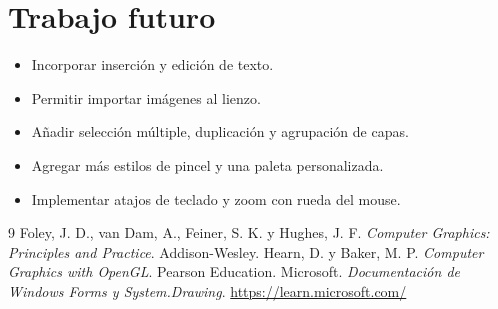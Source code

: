 \documentclass[11pt,a4paper]{report}
\begin{document}
\chapter{Trabajo futuro}

\begin{itemize}
    \item Incorporar inserción y edición de texto.
    \item Permitir importar imágenes al lienzo.
    \item Añadir selección múltiple, duplicación y agrupación de capas.
    \item Agregar más estilos de pincel y una paleta personalizada.
    \item Implementar atajos de teclado y zoom con rueda del mouse.
\end{itemize}

\begin{thebibliography}{9}
 Foley, J. D., van Dam, A., Feiner, S. K. y Hughes, J. F. \textit{Computer Graphics: Principles and Practice}. Addison-Wesley.
 Hearn, D. y Baker, M. P. \textit{Computer Graphics with OpenGL}. Pearson Education.
 Microsoft. \textit{Documentación de Windows Forms y System.Drawing}. \url{https://learn.microsoft.com/}
\end{thebibliography}
\end{document}
